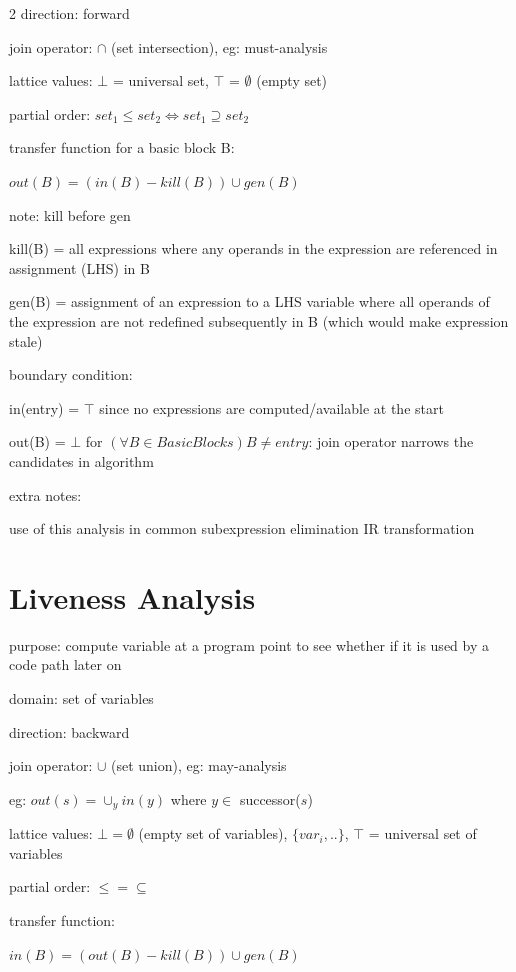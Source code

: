 \documentclass[8pt]{extarticle}
\begin{document}
\begin{multicols*}{2}
  direction: forward

  join operator: $\cap$ (set intersection), eg: must-analysis

  lattice values: $\bot$ = universal set, $\top$ = $\emptyset$ (empty set)

  partial order: $set_1 \leq set_2 \iff set_1 \supseteq set_2$

  transfer function for a basic block B:

  $out(B) = (in(B) - kill(B)) \cup gen(B)$

  note: kill before gen

  kill(B) = all expressions where any operands in the expression are referenced in assignment (LHS) in B

  gen(B) = assignment of an expression to a LHS variable where all operands of the expression are not redefined subsequently in B (which would make expression stale)

  boundary condition:
  
  in(entry) = $\top$ since no expressions are computed/available at the start

  out(B) = $\bot$ for $(\forall B \in BasicBlocks) B \neq entry$: join operator narrows the candidates in algorithm

  extra notes:

  use of this analysis in common subexpression elimination IR transformation

  \vfill\null
  \columnbreak
    
  \section{Liveness Analysis}

  purpose: compute variable at a program point to see whether if it is used by a code path later on

  domain: set of variables

  direction: backward

  join operator: $\cup$ (set union), eg: may-analysis

  eg: $out(s) = \cup_y in(y)$ where $y \in$ successor($s$)

  lattice values: $\bot = \emptyset$ (empty set of variables), $\{var_i, ..\}$, $\top$ = universal set of variables

  partial order: $\leq = \subseteq$

  transfer function:

  $in(B) = (out(B) - kill(B)) \cup gen(B)$


\end{multicols*}
\end{document}
